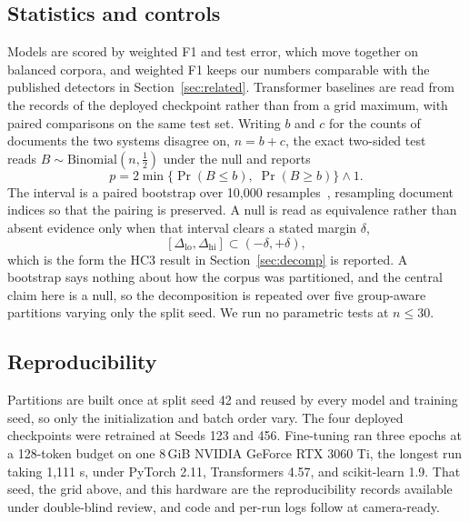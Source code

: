 \documentclass[conference,a4paper]{IEEEtran}
\newcommand{\secref}[1]{\hyperref[#1]{\ref*{#1}}}
\begin{document}
\subsection{Statistics and controls}
\label{sec:stats}

Models are scored by weighted F1 and test error, which move together on balanced corpora, and weighted F1 keeps our numbers comparable with the published detectors in Section~\secref{sec:related}. Transformer baselines are read from the records of the deployed checkpoint rather than from a grid maximum, with paired comparisons on the same test set. Writing $b$ and $c$ for the counts of documents the two systems disagree on, $n=b+c$, the exact two-sided test~\cite{McNemar1947note} reads $B \sim \mathrm{Binomial}(n, \tfrac{1}{2})$ under the null and reports
\begin{equation}
\label{eq:mcnemar}
p = 2\min\big\{\Pr(B \le b),\; \Pr(B \ge b)\big\} \wedge 1 .
\end{equation}
The interval is a paired bootstrap over 10,000 resamples~\cite{Efron1979bootstrap}, resampling document indices so that the pairing is preserved. A null is read as equivalence rather than absent evidence only when that interval clears a stated margin $\delta$,
\begin{equation}
\label{eq:tost}
[\Delta_{\text{lo}}, \Delta_{\text{hi}}] \subset (-\delta, +\delta),
\end{equation}
which is the form the HC3 result in Section~\secref{sec:decomp} is reported. A bootstrap says nothing about how the corpus was partitioned, and the central claim here is a null, so the decomposition is repeated over five group-aware partitions varying only the split seed. We run no parametric tests at $n \le 30$.

\subsection{Reproducibility}
\label{sec:repro}

Partitions are built once at split seed 42 and reused by every model and training seed, so only the initialization and batch order vary. The four deployed checkpoints were retrained at Seeds 123 and 456. Fine-tuning ran three epochs at a 128-token budget on one 8\,GiB NVIDIA GeForce RTX 3060 Ti, the longest run taking 1,111 s, under PyTorch 2.11, Transformers 4.57, and scikit-learn 1.9. That seed, the grid above, and this hardware are the reproducibility records available under double-blind review, and code and per-run logs follow at camera-ready.
\end{document}
